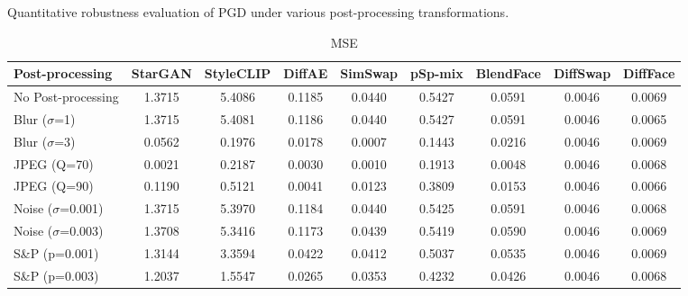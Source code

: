 \documentclass{article}
\begin{document}
\begin{table}[h!]
\caption{Quantitative robustness evaluation of PGD under various post-processing transformations.}
\label{tab:robust_pgd}
\centering
\small

\begin{subtable}{\textwidth}
\caption{MSE}
\centering
\scriptsize
\begin{tabular}{lcccccccc}
\toprule
\textbf{Post-processing} & StarGAN & StyleCLIP & DiffAE & SimSwap & pSp-mix & BlendFace & DiffSwap & DiffFace \\
\midrule
No Post-processing & 1.3715 & 5.4086 & 0.1185 & 0.0440 & 0.5427 & 0.0591 & 0.0046 & 0.0069 \\
\midrule
Blur ($\sigma$=1) & 1.3715 & 5.4081 & 0.1186 & 0.0440 & 0.5427 & 0.0591 & 0.0046 &0.0065\\
Blur ($\sigma$=3) & 0.0562 & 0.1976 & 0.0178 & 0.0007 & 0.1443 & 0.0216 & 0.0046 & 0.0069 \\
JPEG (Q=70) & 0.0021 & 0.2187 & 0.0030 & 0.0010 & 0.1913 & 0.0048 & 0.0046 & 0.0068 \\
JPEG (Q=90) & 0.1190 & 0.5121 & 0.0041 & 0.0123 & 0.3809 & 0.0153 & 0.0046 & 0.0066 \\
Noise ($\sigma$=0.001) & 1.3715 & 5.3970 & 0.1184 & 0.0440 & 0.5425 & 0.0591 & 0.0046 & 0.0068 \\
Noise ($\sigma$=0.003) & 1.3708 & 5.3416 & 0.1173 & 0.0439 & 0.5419 & 0.0590 & 0.0046 & 0.0069 \\
S\&P (p=0.001) & 1.3144 & 3.3594 & 0.0422 & 0.0412 & 0.5037 & 0.0535 & 0.0046 & 0.0069 \\
S\&P (p=0.003) & 1.2037 & 1.5547 & 0.0265 & 0.0353 & 0.4232 & 0.0426 & 0.0046 & 0.0068 \\
\bottomrule
\end{tabular}
\end{subtable}


\end{table}
\end{document}
